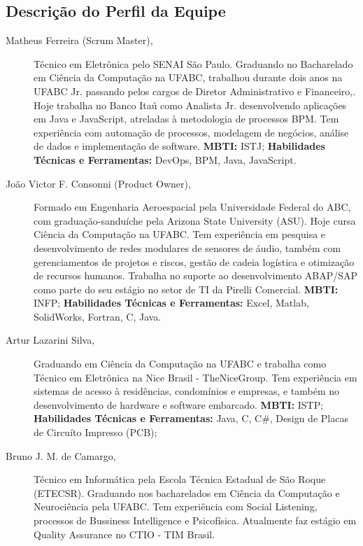 \documentclass[12pt]{article}
\begin{document}
\subsection{Descrição do Perfil da Equipe}

\begin{description}
\item[Matheus Ferreira (Scrum Master),] \noindent Técnico em Eletrônica pelo SENAI São Paulo. Graduando no Bacharelado em Ciência da Computação na UFABC, trabalhou durante dois anos na UFABC Jr. passando pelos cargos de Diretor Administrativo e Financeiro,. Hoje trabalha no Banco Itaú como Analista Jr. desenvolvendo aplicações em Java e JavaScript, atreladas à metodologia de processos BPM. Tem experiência com automação de processos, modelagem de negócios, análise de dados e implementação de software.
\subitem \textbf{MBTI:} ISTJ;
\subitem \textbf{Habilidades Técnicas e Ferramentas: } DevOps, BPM, Java, JavaScript.
\newline
\item[João Victor F. Consonni (Product Owner),]\noindent Formado em Engenharia Aeroespacial pela Universidade Federal do ABC, com graduação-sanduíche pela Arizona State University (ASU). Hoje cursa Ciência da Computação na UFABC. Tem experiência em pesquisa  e desenvolvimento de redes modulares de sensores de áudio, também com gerenciamentos de projetos e riscos, gestão de cadeia logística e otimização de recursos humanos. Trabalha no suporte ao desenvolvimento ABAP/SAP como parte do seu estágio no setor de TI da Pirelli Comercial. 
\subitem \textbf{MBTI:} INFP;
\subitem \textbf{Habilidades Técnicas e Ferramentas:} Excel, Matlab, SolidWorks, Fortran, C, Java.
\newline
\item[Artur Lazarini Silva,] \noindent Graduando em Ciência da Computação na UFABC e trabalha como Técnico em Eletrônica na Nice Brasil - TheNiceGroup. Tem experiência em sistemas de acesso à residências, condomínios e empresas, e também no desenvolvimento de hardware e software embarcado.
\subitem \textbf{MBTI:} ISTP;
\subitem \textbf{Habilidades Técnicas e Ferramentas:} Java, C, C\#, Design de Placas de Circuíto Impresso (PCB);
\newline
\item[Bruno J. M. de Camargo,]\noindent Técnico em Informática pela Escola Técnica Estadual de São Roque (ETECSR). Graduando nos bacharelados em Ciência da Computação e Neurociência pela UFABC. Tem experiência com Social Listening, processos de Bussiness Intelligence e Psicofísica. Atualmente faz estágio em Quality Assurance no CTIO - TIM Brasil. 

\end{description}
\end{document}
